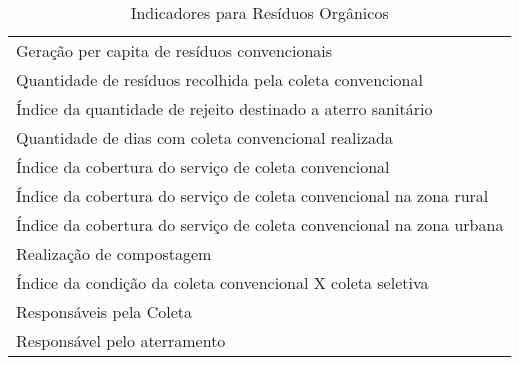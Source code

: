 \begin{table}[h!]
  \centering
  \caption{Indicadores para Resíduos Orgânicos}
    \begin{tabular}{|p{31.715em}|}
    \rowcolor[rgb]{ .984,  .831,  .706} \multicolumn{1}{p{31.715em}}{RESÍDUOS SÓLIDOS ORGÂNICOS (COLETA CONVENCIONAL)} \\
    \midrule
    Geração per capita de resíduos convencionais \\
    \midrule
    Quantidade de resíduos recolhida pela coleta convencional  \\
    \midrule
    Índice da quantidade de rejeito destinado a aterro sanitário \\
    \midrule
    Quantidade de dias com coleta convencional realizada \\
    \midrule
    Índice da cobertura do serviço de coleta convencional \\
    \midrule
    Índice da cobertura do serviço de coleta convencional na zona rural \\
    \midrule
    Índice da cobertura do serviço de coleta convencional na zona urbana \\
    \midrule
    Realização de compostagem \\
    \midrule
    Índice da condição da coleta convencional X coleta seletiva \\
    \midrule
    Responsáveis pela Coleta \\
    \midrule
    Responsável pelo aterramento \\
    \bottomrule
    \end{tabular}%
  \label{tab:ind_organico}%
\end{table}%
